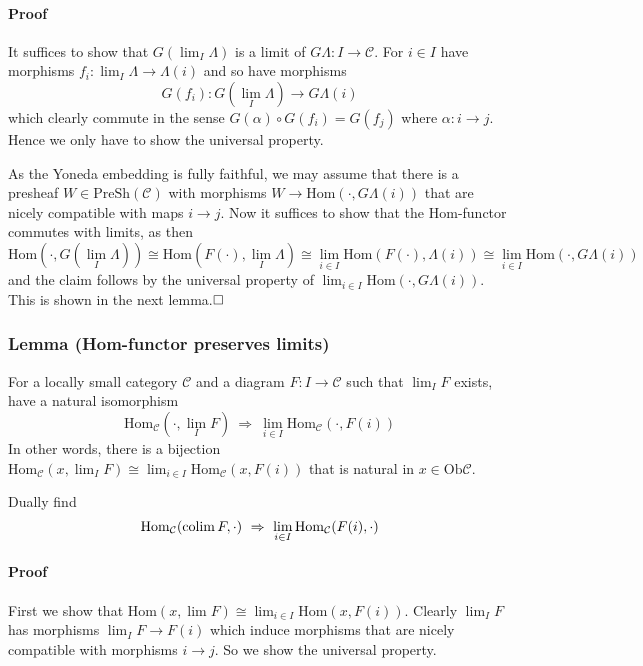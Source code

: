 \paragraph{Proof}
It suffices to show that $G(\lim_I \Lambda)$ is a limit of $G \Lambda: I \to \mathcal{C}$.
For $i \in I$ have morphisms $f_i: \lim_I \Lambda \to \Lambda(i)$ and so have morphisms
\begin{equation*}
    G(f_i): G(\lim_I \Lambda) \to G \Lambda(i)
\end{equation*}
which clearly commute in the sense $G(\alpha) \circ G(f_i) = G(f_j)$ where $\alpha: i \to j$.
Hence we only have to show the universal property.

As the Yoneda embedding is fully faithful, we may assume that there is a presheaf $W \in \mathrm{PreSh}(\mathcal{C})$ with morphisms $W \to \mathrm{Hom}(\cdot, G\Lambda(i))$ that are nicely compatible with maps $i \to j$.
Now it suffices to show that the Hom-functor commutes with limits, as then
\begin{equation*}
    \mathrm{Hom}(\cdot, G(\lim_I \Lambda)) \cong \mathrm{Hom}(F(\cdot), \lim_I \Lambda) \cong \lim_{i \in I} \mathrm{Hom}(F(\cdot), \Lambda(i)) \cong \lim_{i \in I} \mathrm{Hom}(\cdot, G\Lambda(i))
\end{equation*}
and the claim follows by the universal property of $\lim_{i \in I} \mathrm{Hom}(\cdot, G\Lambda(i))$.
This is shown in the next lemma.$\hfill\square$

\subsubsection{Lemma (Hom-functor preserves limits)}
For a locally small category $\mathcal{C}$ and a diagram $F: I \to \mathcal{C}$ such that $\lim_I F$ exists, have a natural isomorphism
\begin{equation*}
    \mathrm{Hom}_{\mathcal{C}}(\cdot, \lim_I F) \ \Rightarrow \ \lim_{i \in I} \mathrm{Hom}_{\mathcal{C}}(\cdot, F(i))
\end{equation*}
In other words, there is a bijection $\mathrm{Hom}_{\mathcal{C}}(x, \lim_I F) \cong \lim_{i \in I} \mathrm{Hom}_{\mathcal{C}}(x, F(i))$ that is natural in $x \in \mathrm{Ob}\mathcal{C}$.

Dually find
\begin{equation*}
    \mathrm{Hom}_{\mathcal{C}}(\colim F, \cdot) \ \Rightarrow \ \lim_{i \in I} \mathrm{Hom}_{\mathcal{C}}(F(i), \cdot)
\end{equation*}
\paragraph{Proof}
First we show that $\mathrm{Hom}(x, \lim F) \cong \lim_{i \in I} \mathrm{Hom}(x, F(i))$.
Clearly $\lim_I F$ has morphisms $\lim_I F \to F(i)$ which induce morphisms that are nicely compatible with morphisms $i \to j$. 
So we show the universal property.

